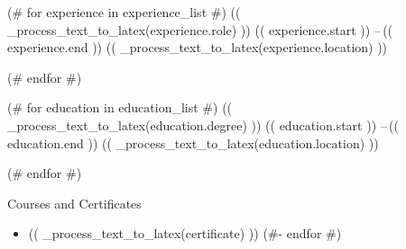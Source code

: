\documentclass[10pt,a4paper,ragged2e,withhyper]{altacv}
\begin{document}
  \begin{paracol}{2}


    (# for experience in experience_list #)
        \cvevent
            {(( _process_text_to_latex(experience.role) ))}
            {}
            {(( experience.start )) --\,(( experience.end ))}
            {(( _process_text_to_latex(experience.location) ))}%
        \hfill\par%
        \bigskip%
    (# endfor #)

    \vspace{-0.3em} %
    (# for education in education_list #)
        \cvevent
            {(( _process_text_to_latex(education.degree) ))}
            {}
            {(( education.start )) --\,(( education.end ))}
            {(( _process_text_to_latex(education.location) ))}%
        \hfill\par%
        \bigskip%
    (# endfor #)

    \smallskip\divider%
    \vspace{-0.6em} %

    \cvevent
        {Courses and Certificates}
        {}
        {}
        {}%
    \begin{itemize}
        \setlength\itemsep{0em}
        (#- for certificate in certificates_list #)
            \item (( _process_text_to_latex(certificate) ))
        (#- endfor #)
    \end{itemize}



\end{paracol}
\end{document}
